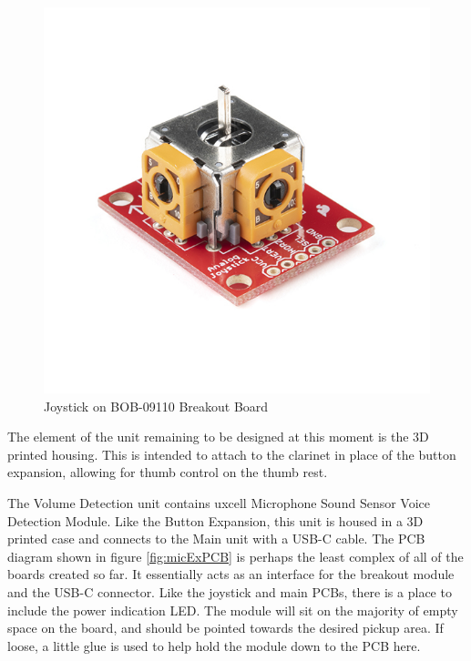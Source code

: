 \begin{figure}
    \centering
    \includegraphics{diagrams/oem/16273-Thumb_Joystick_-_Deluxe-03.jpg}
    \caption{Joystick on BOB-09110 Breakout Board}
    \label{fig:js2}
\end{figure}

The element of the unit remaining to be designed at this moment is the 3D printed housing. This is intended to attach to the clarinet in place of the button expansion, allowing for thumb control on the thumb rest.


The Volume Detection unit contains uxcell Microphone Sound Sensor Voice Detection Module. Like the Button Expansion, this unit is housed in a 3D printed case and connects to the Main unit with a USB-C cable. The PCB diagram shown in figure \ref{fig:micExPCB} is perhaps the least complex of all of the boards created so far. It essentially acts as an interface for the breakout module and the USB-C connector. Like the joystick and main PCBs, there is a place to include the power indication LED. The module will sit on the majority of empty space on the board, and should be pointed towards the desired pickup area. If loose, a little glue is used to help hold the module down to the PCB here. 

